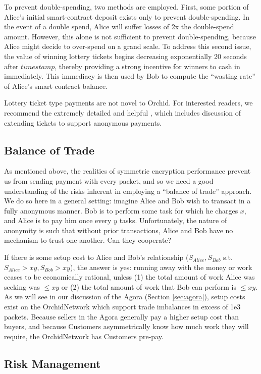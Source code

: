 \documentclass{article}
\newcommand{\orchid}{Orchid}
\newcommand{\Orchid}{\orchid}
\begin{document}
To prevent double-spending, two methods are employed. First, some portion of Alice's initial smart-contract deposit exists only to prevent double-spending. In the event of a double spend, Alice will suffer losses of 2x the double-spend amount. However, this alone is not sufficient to prevent double-spending, because Alice might decide to over-spend on a grand scale. To address this second issue, the value of winning lottery tickets begins decreasing exponentially 20 seconds after $timestamp$, thereby providing a strong incentive for winners to cash in immediately. This immediacy is then used by Bob to compute the ``wasting rate'' of Alice's smart contract balance.

Lottery ticket type payments are not novel to \Orchid. For interested readers, we recommend the extremely detailed and helpful \cite{DAM}, which includes discussion of extending tickets to support anonymous payments.

\subsection{Balance of Trade}
\label{tokens-bot}

As mentioned above, the realities of symmetric encryption performance prevent us from sending payment with every packet, and so we need a good understanding of the risks inherent in employing a ``balance of trade'' approach. We do so here in a general setting: imagine Alice and Bob wish to transact in a fully anonymous manner. Bob is to perform some task for which he charges $x$, and Alice is to pay him once every $y$ tasks. Unfortunately, the nature of anonymity is such that without prior transactions, Alice and Bob have no mechanism to trust one another. Can they cooperate?

If there is some setup cost to Alice and Bob's relationship ($S_{Alice}, S_{Bob}$ s.t. $S_{Alice} > xy, S_{Bob} > xy$), the answer is yes: running away with the money or work ceases to be economically rational, unless (1) the total amount of work Alice was seeking was $\leq xy$ or (2) the total amount of work that Bob can perform is $\leq xy$. As we will see in our discussion of the Agora (Section \ref{sec:agora}), setup costs exist on the \Orchid Network which support trade imbalances in excess of 1e3 packets. Because sellers in the Agora generally pay a higher setup cost than buyers, and because Customers asymmetrically know how much work they will require, the \Orchid Network has Customers pre-pay.

\subsection{Risk Management}
\end{document}
